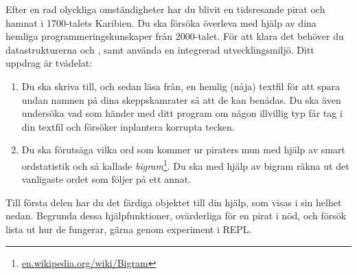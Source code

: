 Efter en rad olyckliga omständigheter har du blivit en tidsresande pirat och hamnat i 1700-talets Karibien. Du ska försöka överleva med hjälp av dina hemliga programmeringskunskaper från 2000-talet. För att klara det behöver du datastrukturerna  och , samt använda en integrerad utvecklingsmiljö.
Ditt uppdrag är tvådelat:
\begin{enumerate}
\item Du ska skriva till, och sedan läsa från, en hemlig (nåja) textfil för att spara undan namnen på dina skeppskamrater så att de kan benådas. Du ska även undersöka vad som händer med ditt program om någon illvillig typ får tag i din textfil och försöker inplantera korrupta tecken.
\item Du ska förutsäga vilka ord som kommer ur piraters mun med hjälp av smart ordstatistik och så kallade \emph{bigram}\footnote{\href{https://en.wikipedia.org/wiki/Bigram}{en.wikipedia.org/wiki/Bigram}}. Du ska med hjälp av bigram räkna ut det vanligaste ordet som följer på ett annat.
\end{enumerate}

Till första delen har du det färdiga objektet  till din hjälp, som visas i sin helhet nedan. Begrunda dessa hjälpfunktioner, ovärderliga för en pirat i nöd, och försök lista ut hur de fungerar, gärna genom experiment i REPL.



%
%
%


